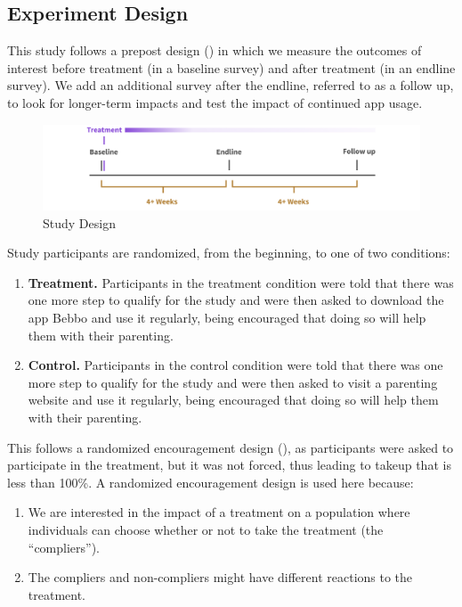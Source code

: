 \documentclass{article}
\begin{document}
\subsection*{Experiment Design}

This study follows a prepost design (\cite{Clifford2021}) in which we measure the outcomes of interest before treatment (in a baseline survey) and after treatment (in an endline survey). We add an additional survey after the endline, referred to as a follow up, to look for longer-term impacts and test the impact of continued app usage.


\begin{figure}[H]
\includegraphics[width=\textwidth]{images/design-timeline.png}
\caption{Study Design}
\label{fig:Study Design}
\end{figure}

\noindent Study participants are randomized, from the beginning, to one of two conditions:

\begin{enumerate}
\item \textbf{Treatment.} Participants in the treatment condition were told that there was one more step to qualify for the study and were then asked to download the app Bebbo and use it regularly, being encouraged that doing so will help them with their parenting.
\item \textbf{Control.} Participants in the control condition were told that there was one more step to qualify for the study and were then asked to visit a parenting website and use it regularly, being encouraged that doing so will help them with their parenting.
\end{enumerate}

\noindent This follows a randomized encouragement design (\cite{Moayyedi2014}), as participants were asked to participate in the treatment, but it was not forced, thus leading to takeup that is less than 100\%. A randomized encouragement design is used here because:

\begin{enumerate}
\item We are interested in the impact of a treatment on a population where individuals can choose whether or not to take the treatment (the “compliers”).
\item The compliers and non-compliers might have different reactions to the treatment.
\end{enumerate}
\end{document}
